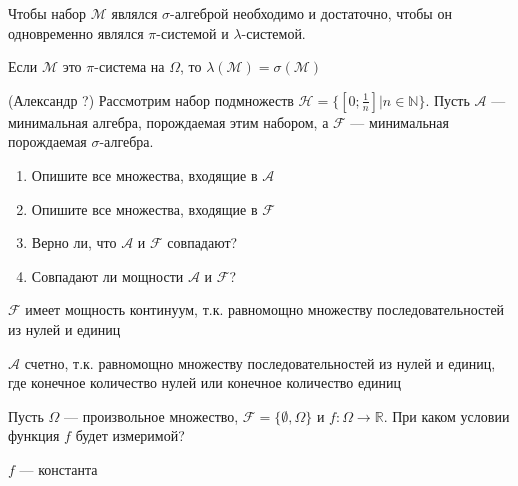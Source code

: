 \begin{problem}
Чтобы набор $\mathcal{M}$ являлся $\sigma$-алгеброй необходимо и
достаточно, чтобы он одновременно являлся $\pi$-системой и
$\lambda$-системой.

\begin{sol}

\end{sol}
\end{problem}

\begin{problem}
Если $\mathcal{M}$ это $\pi$-система на $\Omega$, то
$\lambda(\mathcal{M})=\sigma(\mathcal{M})$

\begin{sol}

\end{sol}
\end{problem}

\begin{problem}
(Александр ?) Рассмотрим набор подмножеств
$\mathcal{H}=\{[0;\frac{1}{n}]|n\in \mathbb{N}\}$. Пусть
$\mathcal{A}$ — минимальная алгебра, порождаемая этим набором, а
$\mathcal{F}$ — минимальная
порождаемая $\sigma$-алгебра.
\begin{enumerate}
\item Опишите все множества, входящие в $\mathcal{A}$
\item  Опишите все множества, входящие в $\mathcal{F}$
\item  Верно ли, что $\mathcal{A}$ и $\mathcal{F}$ совпадают?
\item Совпадают ли мощности $\mathcal{A}$ и $\mathcal{F}$?
\end{enumerate}


\begin{sol}

$\mathcal{F}$ имеет мощность континуум, т.к. равномощно множеству последовательностей из нулей и единиц

$\mathcal{A}$ счетно, т.к. равномощно множеству последовательностей из нулей и единиц, где конечное количество нулей или конечное количество единиц

\end{sol}
\end{problem}

\begin{problem}
Пусть $\Omega$ — произвольное множество,
$\mathcal{F}=\{\emptyset,\Omega\}$ и $f:\Omega\rightarrow
\mathbb{R}$. При
каком условии функция $f$ будет измеримой?

\begin{sol}
$f$ — константа
\end{sol}
\end{problem}

